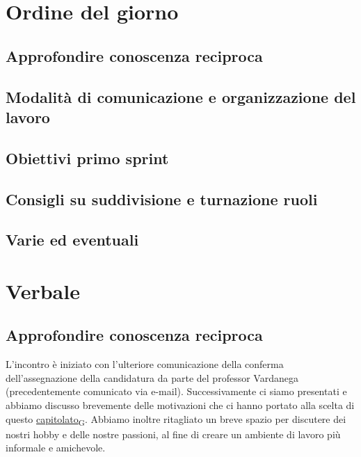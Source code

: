 \documentclass[italian,12pt]{article}
\begin{document}
\section{Ordine del giorno}
\subsection{Approfondire conoscenza reciproca}
\subsection{Modalità di comunicazione e organizzazione del lavoro}
\subsection{Obiettivi primo sprint}
\subsection{Consigli su suddivisione e turnazione ruoli}
\subsection{Varie ed eventuali}

\newpage

\section{Verbale}

\subsection{Approfondire conoscenza reciproca}
L'incontro è iniziato con l'ulteriore comunicazione della conferma dell'assegnazione 
della candidatura da parte del professor Vardanega (precedentemente comunicato via e-mail). 
Successivamente ci siamo presentati e abbiamo discusso brevemente delle motivazioni 
che ci hanno portato alla scelta di questo \href{https://7last.github.io/docs/rtb/documentazione-interna/glossario#capitolato}{capitolato\textsubscript{G}}. Abbiamo inoltre ritagliato un breve spazio 
per discutere dei nostri hobby e delle nostre passioni, al fine di creare un ambiente di lavoro 
più informale e amichevole.
\end{document}
